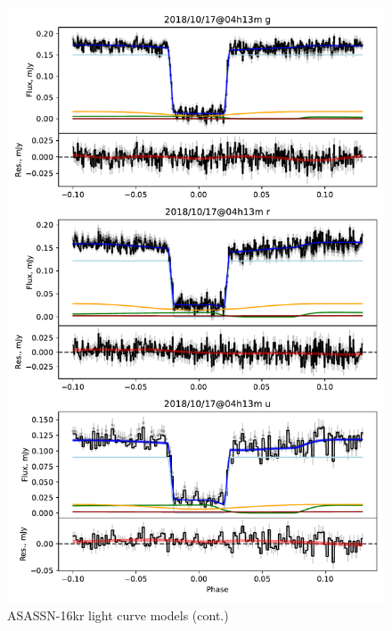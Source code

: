 \begin{figure}
    \centering
    \includegraphics[width=\textwidth]{figures/results/three_cvs_with_weird_colours/ASASSN-16kr/ASASSN-16kr_4.pdf}
    \caption{ASASSN-16kr light curve models (cont.)}
    \label{fig:ASASSN-16kr all light curves cont 3}
\end{figure}
